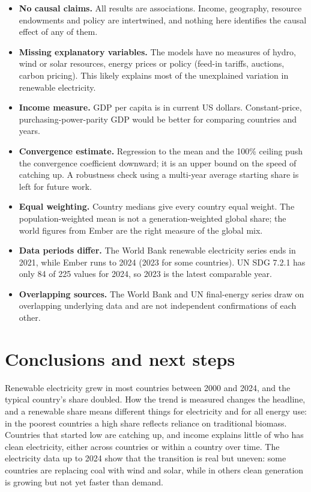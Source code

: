 \documentclass[11pt,a4paper]{article}
\begin{document}
\begin{itemize}
  \item \textbf{No causal claims.} All results are associations. Income, geography, resource endowments and policy are intertwined, and nothing here identifies the causal effect of any of them.
  \item \textbf{Missing explanatory variables.} The models have no measures of hydro, wind or solar resources, energy prices or policy (feed-in tariffs, auctions, carbon pricing). This likely explains most of the unexplained variation in renewable electricity.
  \item \textbf{Income measure.} GDP per capita is in current US dollars. Constant-price, purchasing-power-parity GDP would be better for comparing countries and years.
  \item \textbf{Convergence estimate.} Regression to the mean and the 100\% ceiling push the convergence coefficient downward; it is an upper bound on the speed of catching up. A robustness check using a multi-year average starting share is left for future work.
  \item \textbf{Equal weighting.} Country medians give every country equal weight. The population-weighted mean is not a generation-weighted global share; the world figures from Ember are the right measure of the global mix.
  \item \textbf{Data periods differ.} The World Bank renewable electricity series ends in 2021, while Ember runs to 2024 (2023 for some countries). UN SDG 7.2.1 has only 84 of 225 values for 2024, so 2023 is the latest comparable year.
  \item \textbf{Overlapping sources.} The World Bank and UN final-energy series draw on overlapping underlying data and are not independent confirmations of each other.
\end{itemize}

\section{Conclusions and next steps}\label{sec:conclusion}

Renewable electricity grew in most countries between 2000 and 2024, and the typical country's share doubled. How the trend is measured changes the headline, and a renewable share means different things for electricity and for all energy use: in the poorest countries a high share reflects reliance on traditional biomass. Countries that started low are catching up, and income explains little of who has clean electricity, either across countries or within a country over time. The electricity data up to 2024 show that the transition is real but uneven: some countries are replacing coal with wind and solar, while in others clean generation is growing but not yet faster than demand.
\end{document}
